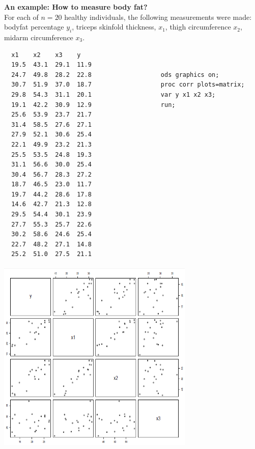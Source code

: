 \textbf{An example: How to measure body fat?} \\
For each of $n=20$ healthy individuals, the following measurements were made: bodyfat percentage $y_i$, triceps skinfold thickness, $x_{1}$, thigh circumference $x_{2}$, midarm circumference $x_{3}$.\\

\begin{small}
\begin{verbatim}
  x1    x2    x3    y
  19.5  43.1  29.1  11.9
  24.7  49.8  28.2  22.8                   ods graphics on;
  30.7  51.9  37.0  18.7                   proc corr plots=matrix;
  29.8  54.3  31.1  20.1                   var y x1 x2 x3;
  19.1  42.2  30.9  12.9                   run;
  25.6  53.9  23.7  21.7
  31.4  58.5  27.6  27.1
  27.9  52.1  30.6  25.4
  22.1  49.9  23.2  21.3
  25.5  53.5  24.8  19.3
  31.1  56.6  30.0  25.4
  30.4  56.7  28.3  27.2
  18.7  46.5  23.0  11.7
  19.7  44.2  28.6  17.8
  14.6  42.7  21.3  12.8
  29.5  54.4  30.1  23.9
  27.7  55.3  25.7  22.6
  30.2  58.6  24.6  25.4
  22.7  48.2  27.1  14.8
  25.2  51.0  27.5  21.1
\end{verbatim}
\end{small}

\begin{center}
\includegraphics[height=3.7in,width=3.7in]{bodyfat}
\end{center}

\newpage

